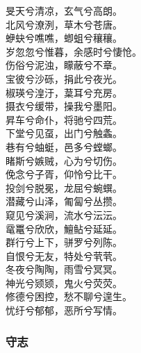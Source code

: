 \documentclass[]{article}
\begin{document}
旻天兮清凉，玄气兮高朗。\\
北风兮潦洌，草木兮苍唐。\\
蛜蚗兮噍噍，蝍蛆兮穰穰。\\
岁忽忽兮惟暮，余感时兮悽怆。\\
伤俗兮泥浊，矇蔽兮不章。\\
宝彼兮沙砾，捐此兮夜光。\\
椒瑛兮湟汙，葈耳兮充房。\\
摄衣兮缓带，操我兮墨阳。\\
昇车兮命仆，将驰兮四荒。\\
下堂兮见虿，出门兮触螽。\\
巷有兮蚰蜓，邑多兮螳螂。\\
睹斯兮嫉贼，心为兮切伤。\\
俛念兮子胥，仰怜兮比干。\\
投剑兮脱冕，龙屈兮蜿蟤。\\
潜藏兮山泽，匍匐兮丛攒。\\
窥见兮溪涧，流水兮沄沄。\\
鼋鼍兮欣欣，鱣鲇兮延延。\\
群行兮上下，骈罗兮列陈。\\
自恨兮无友，特处兮茕茕。\\
冬夜兮陶陶，雨雪兮冥冥。\\
神光兮颎颎，鬼火兮荧荧。\\
修德兮困控，愁不聊兮遑生。\\
忧纡兮郁郁，恶所兮写情。

\hypertarget{header-n410}{%
\subsubsection{守志}\label{header-n410}}
\end{document}
